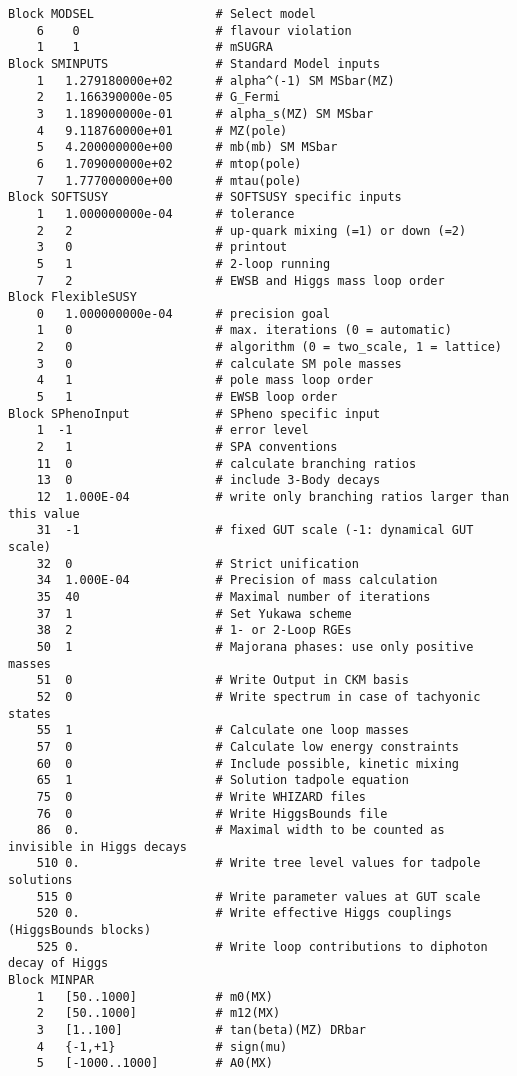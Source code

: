 \documentclass[final,3p,times,pdflatex]{elsarticle}
\begin{document}
\begin{verbatim}
Block MODSEL                 # Select model
    6    0                   # flavour violation
    1    1                   # mSUGRA
Block SMINPUTS               # Standard Model inputs
    1   1.279180000e+02      # alpha^(-1) SM MSbar(MZ)
    2   1.166390000e-05      # G_Fermi
    3   1.189000000e-01      # alpha_s(MZ) SM MSbar
    4   9.118760000e+01      # MZ(pole)
    5   4.200000000e+00      # mb(mb) SM MSbar
    6   1.709000000e+02      # mtop(pole)
    7   1.777000000e+00      # mtau(pole)
Block SOFTSUSY               # SOFTSUSY specific inputs
    1   1.000000000e-04      # tolerance
    2   2                    # up-quark mixing (=1) or down (=2)
    3   0                    # printout
    5   1                    # 2-loop running
    7   2                    # EWSB and Higgs mass loop order
Block FlexibleSUSY
    0   1.000000000e-04      # precision goal
    1   0                    # max. iterations (0 = automatic)
    2   0                    # algorithm (0 = two_scale, 1 = lattice)
    3   0                    # calculate SM pole masses
    4   1                    # pole mass loop order
    5   1                    # EWSB loop order
Block SPhenoInput            # SPheno specific input
    1  -1                    # error level
    2   1                    # SPA conventions
    11  0                    # calculate branching ratios
    13  0                    # include 3-Body decays
    12  1.000E-04            # write only branching ratios larger than this value
    31  -1                   # fixed GUT scale (-1: dynamical GUT scale)
    32  0                    # Strict unification
    34  1.000E-04            # Precision of mass calculation
    35  40                   # Maximal number of iterations
    37  1                    # Set Yukawa scheme
    38  2                    # 1- or 2-Loop RGEs
    50  1                    # Majorana phases: use only positive masses
    51  0                    # Write Output in CKM basis
    52  0                    # Write spectrum in case of tachyonic states
    55  1                    # Calculate one loop masses
    57  0                    # Calculate low energy constraints
    60  0                    # Include possible, kinetic mixing
    65  1                    # Solution tadpole equation
    75  0                    # Write WHIZARD files
    76  0                    # Write HiggsBounds file
    86  0.                   # Maximal width to be counted as invisible in Higgs decays
    510 0.                   # Write tree level values for tadpole solutions
    515 0                    # Write parameter values at GUT scale
    520 0.                   # Write effective Higgs couplings (HiggsBounds blocks)
    525 0.                   # Write loop contributions to diphoton decay of Higgs
Block MINPAR
    1   [50..1000]           # m0(MX)
    2   [50..1000]           # m12(MX)
    3   [1..100]             # tan(beta)(MZ) DRbar
    4   {-1,+1}              # sign(mu)
    5   [-1000..1000]        # A0(MX)
\end{verbatim}
\end{document}
